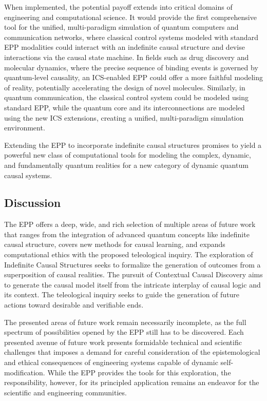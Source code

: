When implemented, the potential payoff extends into critical domains of engineering and computational science. It would provide the first comprehensive tool for the unified, multi-paradigm simulation of quantum computers and communication networks, where classical control systems modeled with standard EPP modalities could interact with an indefinite causal structure and devise interactions via the causal state machine. In fields such as drug discovery and molecular dynamics, where the precise sequence of binding events is governed by quantum-level causality, an ICS-enabled EPP could offer a more faithful modeling of reality, potentially accelerating the design of novel molecules. Similarly, in quantum communication, the classical control system could be modeled using standard EPP, while the quantum core and its interconnections are modeled using the new ICS extensions, creating a unified, multi-paradigm simulation environment.

Extending the EPP to incorporate indefinite causal structures promises to yield a powerful new class of computational tools for modeling the complex, dynamic, and fundamentally quantum realities for a new category of dynamic quantum causal systems.  
  
  \subsection{Discussion}

The EPP offers a deep, wide, and rich selection of multiple areas of future work that ranges from the integration of advanced quantum concepts like indefinite causal structure, covers new methods for causal learning, and expands  computational ethics with the proposed teleological inquiry. The exploration of Indefinite Causal Structures seeks to formalize the generation of outcomes from a superposition of causal realities. The pursuit of Contextual Causal Discovery aims to generate the causal model itself from the intricate interplay of causal logic and its context. The teleological inquiry seeks to guide the generation of future actions toward desirable and verifiable ends. 

The presented areas of future work remain necessarily incomplete, as the full spectrum of possibilities opened by the EPP still has to be discovered. Each presented avenue of future work presents formidable technical and scientific challenges that imposes a demand for careful consideration of the epistemological and ethical consequences of engineering systems capable of dynamic self-modification. While the EPP provides the tools for this exploration, the responsibility, however, for its principled application remains an endeavor for the scientific and engineering communities.


\newpage
